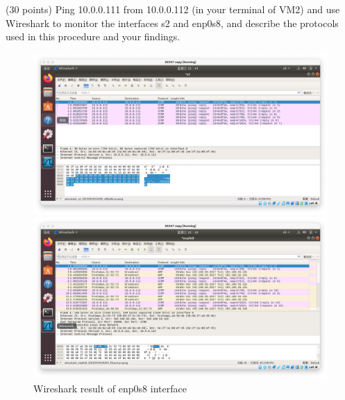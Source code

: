 \begin{exercise}[]{(30 points) Ping 10.0.0.111 from 10.0.0.112 (in your terminal of VM2) and use Wireshark to monitor the interfaces s2 and enp0s8, and describe the protocols used in this procedure and your findings.}
\begin{solution}
  \begin{figure}[ht]
    \begin{center}
    \begin{minipage}[t]{0.48\linewidth}
        \centering
        \includegraphics[width=1\linewidth]{img/lab4/ex1-2.png}
        \caption{Wireshark result of s2 interface}
        \label{fig:ex1-2}
    \end{minipage}
    \begin{minipage}[t]{0.48\linewidth}
        \centering
        \includegraphics[width=1\linewidth]{img/lab4/ex1-3.png}
        \caption{Wireshark result of enp0s8 interface}
        \label{fig:ex1-3}
    \end{minipage}
    \end{center}
  \end{figure}

  \end{solution}
  \label{ex1}
\end{exercise}

\newpage

